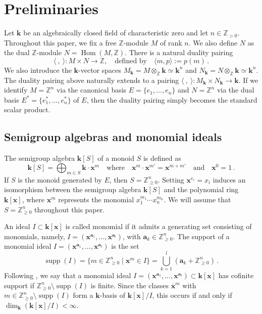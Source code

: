 \documentclass[11pt,letterpaper,reqno]{amsart}
\theoremstyle{remark}
\theoremstyle{definition}
\def\XX{\mathbf{x}}
\newcommand{\KK}[0]{\ensuremath{\mathbf{k}}}
\newcommand{\ZZ}[0]{\ensuremath{\mathbb{Z}}}
\newcommand{\supp}[0]{\ensuremath{\operatorname{supp}}}
\newcommand{\quot}[1]{{\overline{#1}}}
\begin{document}
\section{Preliminaries}\label{sec:preliminaries}

Let $\KK$ be an algebraically closed field of characteristic zero and let $n\in\ZZ_{>0}$. Throughout this paper, we fix a free $\ZZ$-module $M$ of rank $n$. We also define $N$ as the dual $\ZZ$-module $N=\operatorname{Hom}(M,\ZZ)$. There is a natural duality pairing
$$\langle\ ,\ \rangle \colon M\times N\to \ZZ,\quad  \mbox{defined by}\quad \langle m,p\rangle:=p(m)\,.$$
We also introduce the $\KK$-vector spaces $M_\KK=M\otimes_\ZZ \KK\simeq \KK^n$ and $N_\KK=N\otimes_\ZZ \KK\simeq \KK^n$. The duality pairing above naturally extends to a pairing $\langle\ ,\ \rangle \colon M_\KK\times N_\KK\to \KK$. If we identify $M=\ZZ^n$ via the canonical basis $E=\{e_1,\ldots,e_n\}$ and $N=\ZZ^n$ via the dual basis $E^*=\{e^*_1,\ldots,e^*_n\}$ of $E$, then the duality pairing simply becomes the standard scalar product.

\subsection{Semigroup algebras and monomial ideals}
The semigroup algebra $\KK[S]$ of a monoid $S$ is defined as
$$\KK[S]=\bigoplus_{m\in S}\KK\cdot\XX^m\quad\mbox{where}\quad \XX^m\cdot\XX^{m'}=\XX^{m+m'}\quad\mbox{and}\quad \XX^0=1\,.$$
If $S$ is the monoid generated by $E$, then $S=\ZZ_{\geq 0}^n$. Setting $\XX^{e_i}=x_i$ induces an isomorphism between the semigroup algebra $\KK[S]$ and the polynomial ring $\KK[\XX]$, where $\XX^{m}$ represents the monomial $x_1^{m_1}\cdots x_n^{m_n}$. We will assume that $S=\ZZ_{\geq 0}^n$ throughout this paper.

An ideal $I\subset \KK[\XX]$ is called monomial if it admits a generating set consisting of monomials, namely, $I=(\XX^{\mathbf{a}_1},\dots,\XX^{\mathbf{a}_l})$, with $\mathbf{a}_k\in \ZZ^n_{\geq 0}$. The support of a monomial ideal $I=(\XX^{\mathbf{a}_1},\dots,\XX^{\mathbf{a}_l})$ is the set $$\supp(I)=\{m\in \ZZ^n_{\geq 0}\mid \XX^m\in I\}=\bigcup_{k=1}^l (\mathbf{a}_k+\ZZ^n_{\geq 0})\,.$$
Following \cite[Section~1]{DLMR24}, we say that a monomial ideal $I=(\XX^{\mathbf{a}_1},\dots,\XX^{\mathbf{a}_l})\subset \KK[\XX]$ has cofinite support if $\ZZ_{\geq 0}^n\setminus\supp(I)$ is finite. Since the classes $\quot{\XX}^m$ with $m\in\ZZ^n_{\geq 0}\setminus\supp(I)$ form a $\KK$-basis of $\KK[\XX]/I$, this occurs if and only if $\dim_\KK (\KK[\XX]/I)<\infty$.
\end{document}
